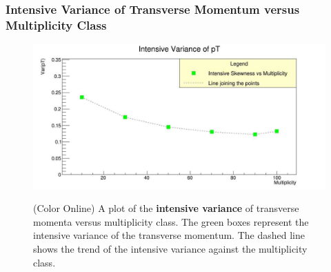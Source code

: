 \documentclass[letterpaper,aps,prc,superscriptaddress,nofootinbib,10pt,showpacs,floatfix]{revtex4-2}%
\begin{document}
\subsubsection{Intensive Variance of Transverse Momentum versus Multiplicity Class}
\label{subsubsec:intvar}
\vspace{-5mm}
\begin{figure}[!htb]
\begin{minipage}{\textwidth}
   \label{Fig:7}
     \centering
     \renewcommand{\thefigure}{7}
     \includegraphics[width=\linewidth]{intvar}
     \begin{minipage}{0.8\textwidth}
     \caption{(Color Online) A plot of the \textbf{intensive variance} of transverse momenta versus multiplicity class. The green boxes represent the intensive variance of the transverse momentum. The dashed line shows the trend of the intensive variance against the multiplicity class.}
     \end{minipage}
\end{minipage}
\end{figure}

\FloatBarrier
\vspace{-3mm}
\end{document}
